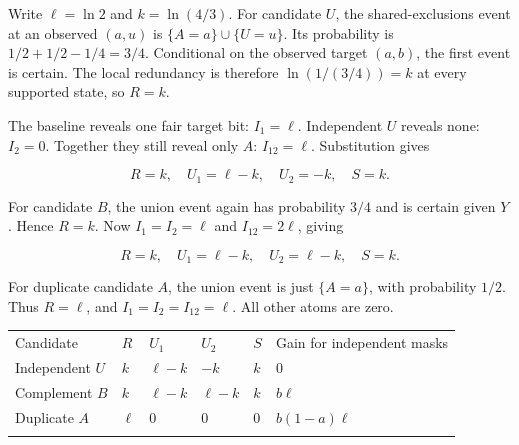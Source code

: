 \documentclass[11pt,a4paper]{article}
\newcounter{none}
\begin{document}
Write \(\ell=\ln2\) and \(k=\ln(4/3)\). For candidate \(U\), the shared-exclusions event at an observed \((a,u)\) is \(\{A=a\}\cup\{U=u\}\). Its probability is \(1/2+1/2-1/4=3/4\). Conditional on the observed target \((a,b)\), the first event is certain. The local redundancy is therefore \(\ln(1/(3/4))=k\) at every supported state, so \(R=k\).

The baseline reveals one fair target bit: \(I_1=\ell\). Independent \(U\) reveals none: \(I_2=0\). Together they still reveal only \(A\): \(I_{12}=\ell\). Substitution gives

\[
R=k,\quad U_1=\ell-k,\quad U_2=-k,\quad S=k.
\]

For candidate \(B\), the union event again has probability \(3/4\) and is certain given \(Y\). Hence \(R=k\). Now \(I_1=I_2=\ell\) and \(I_{12}=2\ell\), giving

\[
R=k,\quad U_1=\ell-k,\quad U_2=\ell-k,\quad S=k.
\]

For duplicate candidate \(A\), the union event is just \(\{A=a\}\), with probability \(1/2\). Thus \(R=\ell\), and \(I_1=I_2=I_{12}=\ell\). All other atoms are zero.

{\def\LTcaptype{none} %
\begin{longtable}[]{@{}
  >{\raggedright\arraybackslash}p{}
  >{\raggedright\arraybackslash}p{}
  >{\raggedright\arraybackslash}p{}
  >{\raggedright\arraybackslash}p{}
  >{\raggedright\arraybackslash}p{}
  >{\raggedright\arraybackslash}p{}@{}}
\toprule\noalign{}
\begin{minipage}[b]{\linewidth}\raggedright
Candidate
\end{minipage} & \begin{minipage}[b]{\linewidth}\raggedright
\(R\)
\end{minipage} & \begin{minipage}[b]{\linewidth}\raggedright
\(U_1\)
\end{minipage} & \begin{minipage}[b]{\linewidth}\raggedright
\(U_2\)
\end{minipage} & \begin{minipage}[b]{\linewidth}\raggedright
\(S\)
\end{minipage} & \begin{minipage}[b]{\linewidth}\raggedright
Gain for independent masks
\end{minipage} \\*
\midrule\noalign{}
\endhead
\bottomrule\noalign{}
\endfoot
Independent \(U\) & \(k\) & \(\ell-k\) & \(-k\) & \(k\) & \(0\) \\*
Complement \(B\) & \(k\) & \(\ell-k\) & \(\ell-k\) & \(k\) & \(b\ell\) \\*
Duplicate \(A\) & \(\ell\) & \(0\) & \(0\) & \(0\) & \(b(1-a)\ell\) \\*
\end{longtable}
}
\end{document}
